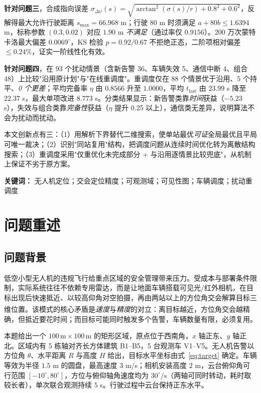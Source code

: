 \documentclass[UTF8,a4paper,zihao=-4,oneside]{ctexart}
\newcommand{\upcite}[1]{\textsuperscript{\cite{#1}}}
\newcommand{\keyword}[1]{\par\vspace{4pt}\noindent\textbf{关键词：} #1}
\begin{document}
\textbf{针对问题三}，合成指向误差 $\sigma_{\Delta\psi}(s)=\sqrt{\arctan^2(\sigma(s)/r)+0.8^2+0.6^2}$，反解得最大允许行驶距离 $s_{\max}=66.968$ m；行驶 $80$ m 时须满足 $a+80b\le1.6394$ m，标称参数 $(0.3,0.02)$ 对应 $1.90$ m \emph{不满足}（通过率仅 $0.9156$）。200 万次蒙特卡洛最大偏差 $0.0069^\circ$，KS 检验 $p=0.92/0.67$ 不拒绝正态，二阶项相对偏差 $\le0.24\%$，证实一阶线性化有效。

\textbf{针对问题四}，在 93 个扰动情景（含新告警 36、车辆失效 5、通信中断 4、组合 48）上比较"沿用原计划"与"在线重调度"。重调度仅在 $88$ 个情景优于沿用、$5$ 个持平、\emph{0 个更差}；平均完备率 $\eta$ 由 $0.8566$ 升至 $1.0000$，平均 $t_{\mathrm{last}}$ 由 $23.99$ s 降至 $22.37$ s，最大单项改进 $8.773$ s。分类结果显示：新告警类靠\emph{时间}获益（$-5.23$ s），失效与组合类靠\emph{完备性}获益（$\eta$ 提升 0.25 以上），通信类无差异，说明算法不会为扰动而扰动。

本文创新点有三：（1）用解析下界替代二维搜索，使单站最优\emph{可证}全局最优且平局可唯一裁决；（2）识别"同站复用"结构，把调度问题从连续时间优化转为离散结构搜索；（3）重调度采用"仅重优化未完成部分 + 与沿用逐情景比较兜底"，从机制上保证不劣于原方案。

\keyword{无人机定位；交会定位精度；可观测域；可见性图；车辆调度；扰动重调度}
\endgroup

\newpage
\setcounter{page}{2}

\section{问题重述}

\subsection{问题背景}

低空小型无人机的违规飞行给重点区域的安全管理带来压力。受成本与部署条件限制，实际系统往往不依赖专用雷达，而是让地面车辆搭载可见光/红外相机，在目标出现后快速抵近、以较高仰角对空拍摄，再由两站以上的方位角交会解算目标三维位置\upcite{torrieri1984,qu2013coop}。该模式的核心矛盾是\emph{速度}与\emph{精度}的对立：离目标越近，方位角交会越精确，但抵近要花时间；而目标可能同时触发多个告警，车辆数量有限，必须复用。

本题给出一个 $100\,\mathrm{m}\times100\,\mathrm{m}$ 的矩形区域，原点位于西南角，$x$ 轴正东、$y$ 轴正北。区域内有 5 栋轴对齐长方体建筑 B1--B5，5 台观测车 V1--V5。无人机告警以方位角 $\theta$、水平距离 $R$ 与高度 $H$ 给出，目标水平坐标由式~\eqref{eq:target} 确定。车辆等效为半径 $1.5$ m 的圆盘，最高速度 $3$ m/s；相机安装高度 $2$ m，云台俯仰角可行范围 $[-10^\circ,80^\circ]$，方位与俯仰轴角速度均为 $30^\circ/\mathrm{s}$（两轴可同时转动，耗时取较长者），单次联合观测持续 $5$ s。行驶过程中云台保持正东水平。
\end{document}
